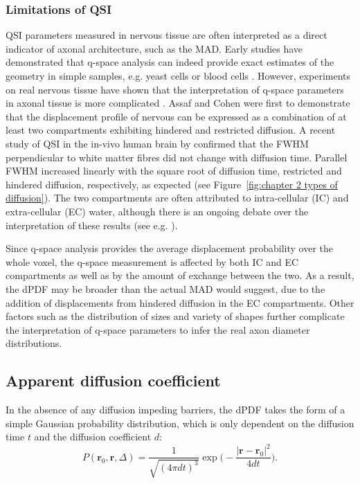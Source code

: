 \subsubsection*{Limitations of QSI}
\Gls{QSI} parameters measured in nervous tissue are often interpreted as a direct indicator of axonal architecture, such as the \gls{MAD}.  Early studies have demonstrated that q-space analysis can indeed provide exact estimates of the geometry in simple samples, e.g. yeast cells \citep{Cory:1990} or blood cells \citep{Kuchel:1997}. However, experiments on real nervous tissue have shown that the interpretation of q-space parameters in axonal tissue is more complicated \citep{King:1994,Assaf:2000,Assaf:2000a,Bar-Shir:2008}. Assaf and Cohen were first to demonstrate that the displacement profile of nervous can be expressed as a combination of at least two compartments exhibiting hindered and restricted diffusion. A recent study of QSI in the in-vivo human brain by \citet{Nilsson:2009} confirmed that the FWHM perpendicular to white matter fibres did not change with diffusion time. Parallel FWHM increased linearly with the square root of diffusion time, restricted and hindered diffusion, respectively, as expected (see Figure~\ref{fig:chapter 2 types of diffusion}). The two compartments are often attributed to intra-cellular (IC) and extra-cellular (EC) water, although there is an ongoing debate over the interpretation of these results (see e.g. \citep{Kiselev:2007, Mulkern:2009}).


Since q-space analysis provides the average displacement probability over the whole voxel, the q-space measurement is affected by both IC and EC compartments as well as by the amount of exchange between the two. As a result, the \gls{dPDF} may be broader than the actual \gls{MAD} would suggest, due to the addition of displacements from hindered diffusion in the EC compartments. Other factors such as the distribution of sizes and variety of shapes further complicate the interpretation of q-space parameters to infer the real axon diameter distributions. 


\subsection{Apparent diffusion coefficient}
\label{subsec:adc}
In the absence of any diffusion impeding barriers, the dPDF takes the form of a simple Gaussian probability distribution, which is only dependent on the diffusion time $t$ and the diffusion coefficient $d$:
\begin{equation}
P(\textbf{r}_{0},\textbf{r},\Delta) =  \frac{1}{\sqrt{(4\pi dt)^3}}\exp\bigg(-\frac{|\textbf{r}-\textbf{r}_{0}|^{2}}{4dt}\bigg).
\label{Gaussian PDF}
\end{equation}


